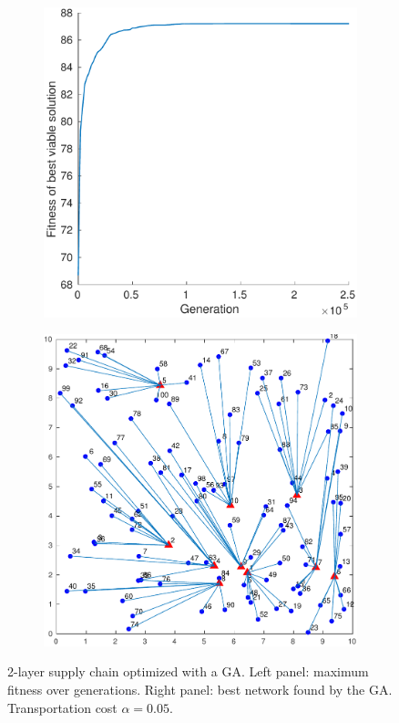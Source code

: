 \documentclass[12pt,titlepage]{article}
\begin{document}
\begin{figure}[hbtp]
    \centering
    \begin{subfigure}[b]{0.475\textwidth}
        \includegraphics[width=\textwidth]{fitness_2l_005.pdf}
    \end{subfigure}%
    \hfill%
    \begin{subfigure}[b]{0.475\textwidth}
        \includegraphics[width=\textwidth]{network_2l_005.pdf}
    \end{subfigure}
    \caption{2-layer supply chain optimized with a GA. Left panel: maximum fitness over generations. Right panel: best network found by the GA. Transportation cost $\alpha = 0.05$.}\label{fig:GA_0.05}
\end{figure}
\end{document}
